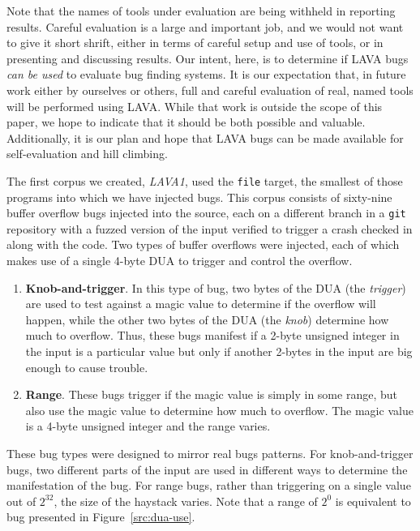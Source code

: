 Note that the names of tools under evaluation are being withheld in reporting results.
Careful evaluation is a large and important job, and we would not want to give it short shrift, either in terms of careful setup and use of tools, or in presenting and discussing results.
Our intent, here, is to determine if LAVA bugs \emph{can be used} to evaluate bug finding systems. 
It is our expectation that, in future work either by ourselves or others, full and careful evaluation of real, named tools will be performed using LAVA.
While that work is outside the scope of this paper, we hope to indicate that it should be both possible and valuable. 
Additionally, it is our plan and hope that LAVA bugs can be made available for self-evaluation and hill climbing.


The first corpus we created, \emph{LAVA1}, used the \verb+file+ target, the smallest of those programs into which we have injected bugs.
This corpus consists of sixty-nine buffer overflow bugs injected into the source, each on a different branch in a \verb+git+ repository with a fuzzed version of the input verified to trigger a crash checked in along with the code.
Two types of buffer overflows were injected, each of which makes use of a single 4-byte DUA to trigger and control the overflow.

\begin{enumerate}
    \item \textbf{Knob-and-trigger}. In this type of bug, two bytes of the DUA (the \emph{trigger}) are used to test against a magic value to determine if the overflow will happen, while the other two bytes of the DUA (the \emph{knob}) determine how much to overflow. Thus, these bugs manifest if a 2-byte unsigned integer in the input is a particular value but only if another 2-bytes in the input are big enough to cause trouble. 
    \item \textbf{Range}. These bugs trigger if the magic value is simply in some range, but also use the magic value to determine how much to overflow.
The magic value is a 4-byte unsigned integer and the range varies.  
\end{enumerate}

These bug types were designed to mirror real bugs patterns.  
For knob-and-trigger bugs, two different parts of the input are used in different ways to determine the manifestation of the bug.  
For range bugs, rather than triggering on a single value out of $2^{32}$, the size of the haystack varies.
Note that a range of $2^0$ is equivalent to bug presented in Figure~\ref{src:dua-use}.

